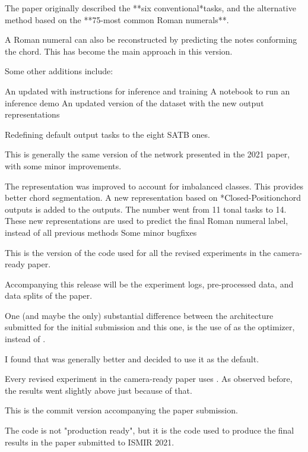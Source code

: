 
The paper originally described the **six conventional*tasks, and the alternative method based on the **75-most common Roman numerals**.

A Roman numeral can also be reconstructed by predicting the notes conforming the chord. This has become the main approach in this version.

Some other additions include:

An updated  with instructions for inference and training
A notebook to run an inference demo
An updated version of the dataset with the new output representations

Redefining default output tasks to the eight SATB ones.

This is generally the same version of the  network presented in the 2021 paper, with some minor improvements.

The  representation was improved to account for imbalanced classes. This provides better chord segmentation.
A new representation based on *Closed-Positionchord outputs is added to the outputs. The number went from 11 tonal tasks to 14. These new representations are used to predict the final Roman numeral label, instead of all previous methods
Some minor bugfixes

This is the version of the code used for all the revised experiments in the camera-ready paper.

Accompanying this release will be the experiment logs, pre-processed data, and data splits of the paper.

One (and maybe the only) substantial difference between the architecture submitted for the initial submission and this one, is the use of  as the optimizer, instead of .

I found that  was generally better and decided to use it as the default.

Every revised experiment in the camera-ready paper uses . As observed before, the results went slightly above just because of that.

This is the commit version accompanying the paper submission.

The code is not "production ready", but it is the code used to produce the final results in the paper submitted to ISMIR 2021.

